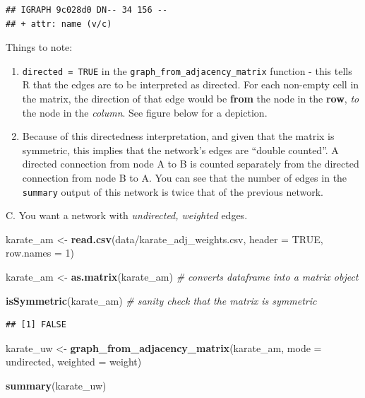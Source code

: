 \documentclass[
]{book}
\newenvironment{Shaded}{\begin{snugshade}}{\end{snugshade}}
\newcommand{\AttributeTok}[1]{\textcolor[rgb]{0.13,0.29,0.53}{#1}}
\newcommand{\CommentTok}[1]{\textcolor[rgb]{0.56,0.35,0.01}{\textit{#1}}}
\newcommand{\ConstantTok}[1]{\textcolor[rgb]{0.56,0.35,0.01}{#1}}
\newcommand{\DecValTok}[1]{\textcolor[rgb]{0.00,0.00,0.81}{#1}}
\newcommand{\FunctionTok}[1]{\textcolor[rgb]{0.13,0.29,0.53}{\textbf{#1}}}
\newcommand{\NormalTok}[1]{#1}
\newcommand{\OtherTok}[1]{\textcolor[rgb]{0.56,0.35,0.01}{#1}}
\newcommand{\StringTok}[1]{\textcolor[rgb]{0.31,0.60,0.02}{#1}}
\providecommand{\tightlist}{%
  \setlength{\itemsep}{0pt}\setlength{\parskip}{0pt}}
\begin{document}
\begin{verbatim}
## IGRAPH 9c028d0 DN-- 34 156 -- 
## + attr: name (v/c)
\end{verbatim}

Things to note:

\begin{enumerate}
\def\labelenumi{\arabic{enumi}.}
\tightlist
\item
  \texttt{directed\ =\ TRUE} in the \texttt{graph\_from\_adjacency\_matrix} function - this tells R that the edges are to be interpreted as directed. For each non-empty cell in the matrix, the direction of that edge would be \textbf{from} the node in the \textbf{row}, \emph{to} the node in the \emph{column}. See figure below for a depiction.
\item
  Because of this directedness interpretation, and given that the matrix is symmetric, this implies that the network's edges are ``double counted''. A directed connection from node A to B is counted separately from the directed connection from node B to A. You can see that the number of edges in the \texttt{summary} output of this network is twice that of the previous network.
\end{enumerate}

C. You want a network with \emph{undirected, weighted} edges.

\begin{Shaded}
\begin{Highlighting}[]
\NormalTok{karate\_am }\OtherTok{\textless{}{-}} \FunctionTok{read.csv}\NormalTok{(}\StringTok{\textquotesingle{}data/karate\_adj\_weights.csv\textquotesingle{}}\NormalTok{, }\AttributeTok{header =} \ConstantTok{TRUE}\NormalTok{, }\AttributeTok{row.names =} \DecValTok{1}\NormalTok{)}

\NormalTok{karate\_am }\OtherTok{\textless{}{-}} \FunctionTok{as.matrix}\NormalTok{(karate\_am) }\CommentTok{\# converts dataframe into a matrix object}

\FunctionTok{isSymmetric}\NormalTok{(karate\_am) }\CommentTok{\# sanity check that the matrix is symmetric }
\end{Highlighting}
\end{Shaded}

\begin{verbatim}
## [1] FALSE
\end{verbatim}

\begin{Shaded}
\begin{Highlighting}[]
\NormalTok{karate\_uw }\OtherTok{\textless{}{-}} \FunctionTok{graph\_from\_adjacency\_matrix}\NormalTok{(karate\_am, }\AttributeTok{mode =} \StringTok{\textquotesingle{}undirected\textquotesingle{}}\NormalTok{, }\AttributeTok{weighted =} \StringTok{\textquotesingle{}weight\textquotesingle{}}\NormalTok{)}

\FunctionTok{summary}\NormalTok{(karate\_uw)}
\end{Highlighting}
\end{Shaded}
\end{document}

